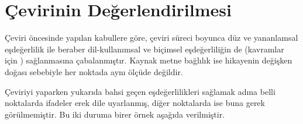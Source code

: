 
\chapter{Çevirinin Değerlendirilmesi}

Çeviri öncesinde yapılan kabullere göre, çeviri süreci boyunca düz ve
yananlamsal eşdeğerlilik ile beraber dil-kullanımsal ve biçimsel eşdeğerliliğin
de (kavramlar için \citealp[bkz.][]{GokturkEsdeger}) sağlanmasına çabalanmıştır.
Kaynak metne bağlılık ise hikayenin değişken doğası sebebiyle her noktada aynı
ölçüde değildir.

Çeviriyi yaparken yukarıda bahsi geçen eşdeğerlilikleri sağlamak adına belli
noktalarda ifadeler erek dile uyarlanmış, diğer noktalarda ise buna gerek
görülmemiştir. Bu iki duruma birer örnek aşağıda verilmiştir.

